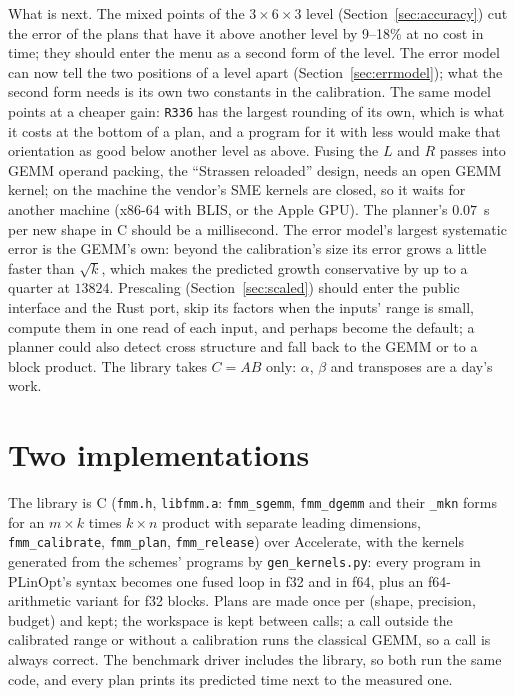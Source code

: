 \documentclass[11pt]{article}
\newcommand{\lv}[1]{\texttt{#1}}
\begin{document}
What is next.  The mixed points of the $3\times6\times3$ level
(Section~\ref{sec:accuracy}) cut the error of the plans that have it above
another level by 9--18\% at no cost in time; they should enter the menu as a
second form of the level.  The error model can now tell the two positions of
a level apart (Section~\ref{sec:errmodel}); what the second form needs is
its own two constants in the calibration.  The same model points at a
cheaper gain: \lv{R336} has the largest rounding of its own, which is what
it costs at the bottom of a plan, and a program for it with less would make
that orientation as good below another level as above.  Fusing the $L$
and $R$ passes into GEMM operand packing, the ``Strassen reloaded'' design,
needs an open GEMM kernel; on the machine the vendor's SME kernels are
closed, so it waits for another machine (x86-64 with BLIS, or the Apple GPU).
The planner's $0.07$~s per new shape in C should be a millisecond.  The error model's largest systematic error is the GEMM's own: beyond the
calibration's size its error grows a little faster than $\sqrt{k}$, which
makes the predicted growth conservative by up to a quarter at $13824$.  Prescaling (Section~\ref{sec:scaled}) should enter the public
interface and the Rust port, skip its factors when the inputs' range is
small, compute them in one read of each input, and perhaps become the
default; a planner could also detect cross structure and fall back to the
GEMM or to a block product.  The
library takes $C=AB$ only: $\alpha$, $\beta$ and transposes are a day's work.

\appendix

\section{Two implementations}\label{sec:impl}

The library is C (\texttt{fmm.h}, \texttt{libfmm.a}: \texttt{fmm\_sgemm},
\texttt{fmm\_dgemm} and their \texttt{\_mkn} forms for an $m\times k$ times
$k\times n$ product with separate leading dimensions, \texttt{fmm\_calibrate},
\texttt{fmm\_plan}, \texttt{fmm\_release}) over Accelerate, with the kernels
generated from the schemes' programs by \texttt{gen\_kernels.py}: every
program in PLinOpt's syntax becomes one fused loop in f32 and in f64, plus an
f64-arithmetic variant for f32 blocks.  Plans are made once per (shape,
precision, budget) and kept; the workspace is kept between calls; a call
outside the calibrated range or without a calibration runs the classical GEMM,
so a call is always correct.  The benchmark driver includes the library, so
both run the same code, and every plan prints its predicted time next to the
measured one.
\end{document}
